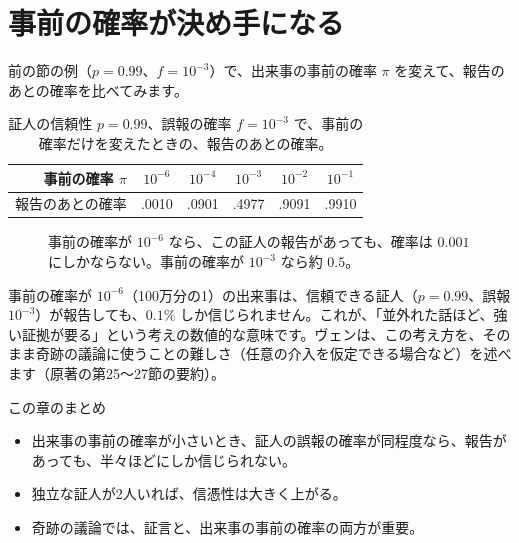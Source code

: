 \documentclass[a4paper,11pt,openany]{ltjsbook}
\begin{document}
\section{事前の確率が決め手になる}

前の節の例（$p=0.99$、$f=10^{-3}$）で、出来事の事前の確率 $\pi$ を変えて、報告のあとの確率を比べてみます。

\begin{table}[htbp]
\centering
\begin{tabular}{r|ccccc}
\toprule
事前の確率 $\pi$ & $10^{-6}$ & $10^{-4}$ & $10^{-3}$ & $10^{-2}$ & $10^{-1}$\\
\midrule
報告のあとの確率 & .0010 & .0901 & .4977 & .9091 & .9910\\
\bottomrule
\end{tabular}
\caption{証人の信頼性 $p=0.99$、誤報の確率 $f=10^{-3}$ で、事前の確率だけを変えたときの、報告のあとの確率。}
\end{table}

\begin{figure}[htbp]
\centering
{}
\caption{事前の確率が $10^{-6}$ なら、この証人の報告があっても、確率は $0.001$ にしかならない。事前の確率が $10^{-3}$ なら約 $0.5$。}
\end{figure}

事前の確率が $10^{-6}$（100万分の1）の出来事は、信頼できる証人（$p=0.99$、誤報 $10^{-3}$）が報告しても、$0.1\%$ しか信じられません。これが、「並外れた話ほど、強い証拠が要る」という考えの数値的な意味です。ヴェンは、この考え方を、そのまま奇跡の議論に使うことの難しさ（任意の介入を仮定できる場合など）を述べます（原著の第25〜27節の要約）。

\begin{pointbox}{この章のまとめ}
\begin{itemize}[leftmargin=*]
\item 出来事の事前の確率が小さいとき、証人の誤報の確率が同程度なら、報告があっても、半々ほどにしか信じられない。
\item 独立な証人が2人いれば、信憑性は大きく上がる。
\item 奇跡の議論では、証言と、出来事の事前の確率の両方が重要。
\end{itemize}
\end{pointbox}
\end{document}
